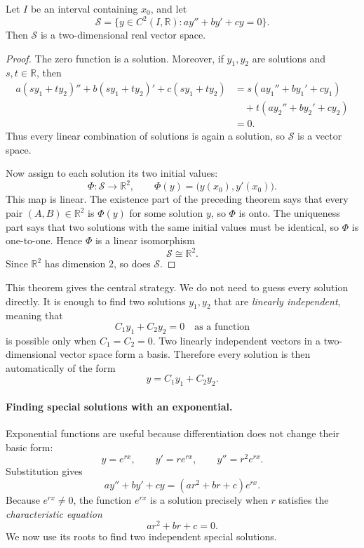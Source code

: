 \begin{theorem}
    Let \(I\) be an interval containing \(x_0\), and let
    \[
        \mathcal{S}
        =\{y\in C^2(I,\mathbb{R}):ay''+by'+cy=0\}.
    \]
    Then \(\mathcal{S}\) is a two-dimensional real vector space.
\end{theorem}
\begin{proof}
    The zero function is a solution.  Moreover, if \(y_1,y_2\) are
    solutions and \(s,t\in\mathbb{R}\), then
    \begin{align*}
        a(sy_1+ty_2)''+b(sy_1+ty_2)'+c(sy_1+ty_2)
        &=s(ay_1''+by_1'+cy_1) \\
        &\quad+t(ay_2''+by_2'+cy_2) \\
        &=0.
    \end{align*}
    Thus every linear combination of solutions is again a solution, so
    \(\mathcal{S}\) is a vector space.

    Now assign to each solution its two initial values:
    \[
        \Phi:\mathcal{S}\longrightarrow\mathbb{R}^2,
        \qquad
        \Phi(y)=\bigl(y(x_0),y'(x_0)\bigr).
    \]
    This map is linear.  The existence part of the preceding theorem says
    that every pair \((A,B)\in\mathbb{R}^2\) is \(\Phi(y)\) for some
    solution \(y\), so \(\Phi\) is onto.  The uniqueness part says that two
    solutions with the same initial values must be identical, so \(\Phi\)
    is one-to-one.  Hence \(\Phi\) is a linear isomorphism
    \[
        \mathcal{S}\cong\mathbb{R}^2.
    \]
    Since \(\mathbb{R}^2\) has dimension \(2\), so does \(\mathcal{S}\).
\end{proof}

This theorem gives the central strategy.  We do not need to guess every
solution directly.  It is enough to find two solutions \(y_1,y_2\) that are
\emph{linearly independent}, meaning that
\[
    C_1y_1+C_2y_2=0
    \quad\text{as a function}
\]
is possible only when \(C_1=C_2=0\).  Two linearly independent vectors in
a two-dimensional vector space form a basis.  Therefore every solution is
then automatically of the form
\[
    \boxed{y=C_1y_1+C_2y_2.}
\]

\paragraph{Finding special solutions with an exponential.}
Exponential functions are useful because differentiation does not change
their basic form:
\[
    y=e^{rx},
    \qquad
    y'=re^{rx},
    \qquad
    y''=r^2e^{rx}.
\]
Substitution gives
\[
    ay''+by'+cy
    =(ar^2+br+c)e^{rx}.
\]
Because \(e^{rx}\neq0\), the function \(e^{rx}\) is a solution precisely
when \(r\) satisfies the \emph{characteristic equation}
\[
    ar^2+br+c=0.
\]
We now use its roots to find two independent special solutions.

